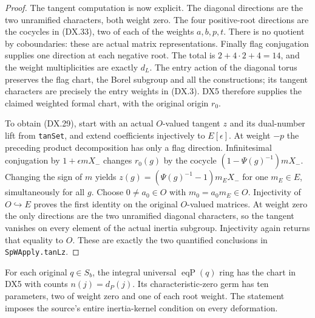 \begin{proof}
The tangent computation is now explicit.
The diagonal directions are the two unramified characters,
both weight zero.
The four positive-root directions are the cocycles in
(DX.33), two of each of the weights $a,b,p,t$.
There is no quotient by coboundaries: these are actual
matrix representations.  Finally flag conjugation supplies
one direction at each negative root.
The total is $2+4\cdot2+4=14$, and the weight multiplicities
are exactly $d_L$.
The entry action of the diagonal torus preserves the
flag chart, the Borel subgroup and all the constructions;
its tangent characters are precisely the entry weights
in (DX.3).  DX5 therefore supplies the claimed weighted
formal chart, with the original origin $r_0$.

To obtain (DX.29), start with an actual $O$-valued tangent
$z$ and its dual-number lift from \texttt{tanSet}, and
extend coefficients injectively to $E[\epsilon]$.
At weight $-p$ the preceding product decomposition has
only a flag direction.  Infinitesimal conjugation by
$1+\epsilon mX_-$ changes $r_0(g)$ by the cocycle
$(1-\Psi(g)^{-1})mX_-$.
Changing the sign of $m$ yields
$z(g)=(\Psi(g)^{-1}-1)m_E X_-$ for one $m_E\in E$,
simultaneously for all $g$.
Choose $0\ne a_0\in O$ with $m_0=a_0m_E\in O$.
Injectivity of $O\hookrightarrow E$ proves the first
identity on the original $O$-valued matrices.
At weight zero the only directions are the two unramified
diagonal characters, so the tangent vanishes on every
element of the actual inertia subgroup.
Injectivity again returns that equality to $O$.
These are exactly the two quantified conclusions in
\texttt{SpWApply.tanLz}.
\end{proof}

\begin{proposition}
\label{claim:DX7}
For each original $q\in S_b$, the integral universal
$\operatorname{eqP}(q)$ ring has the chart in DX5 with counts
$n(j)=d_P(j)$.  Its characteristic-zero germ has ten parameters,
two of weight zero and one of each root weight.
The statement imposes the source's entire inertia-kernel
condition on every deformation.
\end{proposition}

